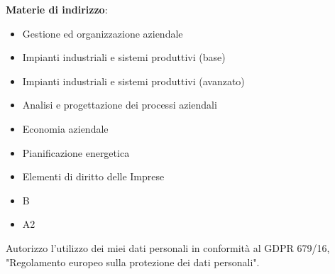 

\textbf{Materie di indirizzo}: %
\begin{itemize}
    \item Gestione ed organizzazione aziendale
    \item Impianti industriali e sistemi produttivi (base)
    \item Impianti industriali e sistemi produttivi (avanzato)
    \item Analisi e progettazione dei processi aziendali
    \item Economia aziendale
    \item Pianificazione energetica
    \item Elementi di diritto delle Imprese
 
\end{itemize}




\begin{itemize}
    \item B
    \item A2
\end{itemize}



\divider

\footnotesize{Autorizzo l'utilizzo dei miei dati personali in conformità al GDPR 679/16, "Regolamento europeo sulla protezione dei dati personali".}

